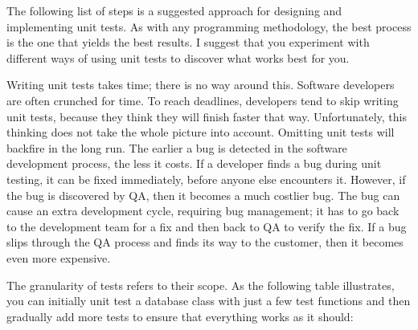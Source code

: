 The following list of steps is a suggested approach for designing and implementing unit tests. As with any programming methodology, the best process is the one that yields the best results. I suggest that you experiment with different ways of using unit tests to discover what works best for you.


Writing unit tests takes time; there is no way around this. Software developers are often crunched for time. To reach deadlines, developers tend to skip writing unit tests, because they think they will finish faster that way. Unfortunately, this thinking does not take the whole picture into account. Omitting unit tests will backfire in the long run. The earlier a bug is detected in the software development process, the less it costs. If a developer finds a bug during unit testing, it can be fixed immediately, before anyone else encounters it. However, if the bug is discovered by QA, then it becomes a much costlier bug. The bug can cause an extra development cycle, requiring bug management; it has to go back to the development team for a fix and then back to QA to verify the fix. If a bug slips through the QA process and finds its way to the customer, then it becomes even more expensive.

The granularity of tests refers to their scope. As the following table illustrates, you can initially unit test a database class with just a few test functions and then gradually add more tests to ensure that everything works as it should:

